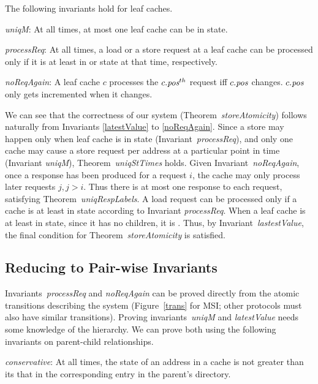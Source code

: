 The following invariants hold for leaf caches.
\begin{inv}
\textit{uniqM}: At all times, at most one leaf cache can be in \Mo{} state.
\label{uniqM}
\end{inv}

\begin{inv}
\textit{processReq}: At all times, a load or a store request at a leaf cache can be processed
only if it is at least in \Sh{} or \Mo{} state at that time, respectively.
\label{processReq}
\end{inv}

\begin{inv}
\textit{noReqAgain}: A leaf cache $c$ processes the $c.\textit{pos}^{th}$ request iff
$c.\textit{pos}$ changes. $c.\textit{pos}$ only gets incremented when it changes.
\label{noReqAgain}
\end{inv}

We can see that the correctness of our system
(Theorem~\textit{storeAtomicity}) follows naturally from Invariants
\ref{latestValue} to \ref{noReqAgain}. Since a store may happen only
when leaf cache is in \Mo{} state (Invariant~\textit{processReq}), and
only one cache may cause a store request per address at a particular
point in time (Invariant \textit{uniqM}), Theorem~\textit{uniqStTimes}
holds. Given Invariant~\textit{noReqAgain}, once a response has been
produced for a request $i$, the cache may only process later requests
$j, j > i$. Thus there is at most one response to each request,
satisfying Theorem~\textit{uniqRespLabels}. A load request can be
processed only if a cache is at least in \Sh{} state according to
Invariant \textit{processReq}.  When a leaf cache is at least in \Sh{}
state, since it has no children, it is \clean{}.  Thus, by
Invariant~\textit{lastestValue}, the final condition for
Theorem~\textit{storeAtomicity} is satisfied.

\subsection{Reducing to Pair-wise Invariants}

Invariants~\textit{processReq} and \textit{noReqAgain} can be proved
directly from the atomic transitions describing the system
(Figure~\ref{trans} for MSI; other protocols must also have similar
transitions). Proving invariants~\textit{uniqM} and
\textit{latestValue} needs some knowledge of the hierarchy. We can
prove both using the following invariants on parent-child
relationships.

\begin{inv}
\textit{conservative}: At all times, the state of an address in a
cache is not greater than its that in the corresponding entry in the
parent's directory.
\label{conservative}
\end{inv}

